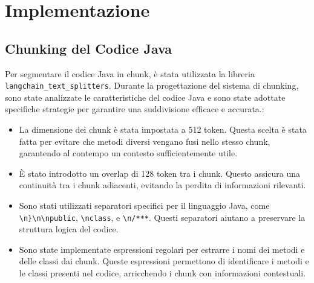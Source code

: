 \documentclass[12pt,a4paper,openright,twoside]{book}
\begin{document}
\section{Implementazione}
\subsection{Chunking del Codice Java}
Per segmentare il codice Java in chunk, è stata utilizzata la libreria \texttt{langchain\_text\_splitters}.
Durante la progettazione del sistema di chunking, sono state analizzate le caratteristiche del codice Java e sono state adottate specifiche strategie per garantire una suddivisione efficace e accurata.:
\begin{itemize}
    \item La dimensione dei chunk è stata impostata a 512 token. 
    Questa scelta è stata fatta per evitare che metodi diversi vengano fusi nello stesso chunk, garantendo al contempo un contesto sufficientemente utile.
    \item È stato introdotto un overlap di 128 token tra i chunk. Questo assicura una continuità tra i chunk adiacenti, evitando la perdita di informazioni rilevanti.
    \item Sono stati utilizzati separatori specifici per il linguaggio Java, come \texttt{\textbackslash n\}\textbackslash n\textbackslash npublic}, \texttt{\textbackslash nclass}, e \texttt{\textbackslash n/***}.
    Questi separatori aiutano a preservare la struttura logica del codice.
    \item Sono state implementate espressioni regolari per estrarre i nomi dei metodi e delle classi dai chunk.
    Queste espressioni permettono di identificare i metodi e le classi presenti nel codice, arricchendo i chunk con informazioni contestuali.
\end{itemize}
\newpage
\end{document}
